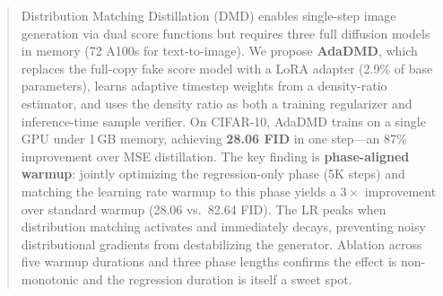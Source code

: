 \documentclass{article}
\theoremstyle{plain}
\theoremstyle{remark}
\begin{document}

\printAffiliationsAndNotice{}

\begin{abstract}
Distribution Matching Distillation (DMD) enables single-step image generation via dual score functions but requires three full diffusion models in memory (72 A100s for text-to-image). We propose \textbf{AdaDMD}, which replaces the full-copy fake score model with a LoRA adapter (2.9\% of base parameters), learns adaptive timestep weights from a density-ratio estimator, and uses the density ratio as both a training regularizer and inference-time sample verifier. On CIFAR-10, AdaDMD trains on a single GPU under 1\,GB memory, achieving \textbf{28.06 FID} in one step---an 87\% improvement over MSE distillation. The key finding is \textbf{phase-aligned warmup}: jointly optimizing the regression-only phase (5K steps) and matching the learning rate warmup to this phase yields a $3{\times}$ improvement over standard warmup (28.06 vs.\ 82.64 FID). The LR peaks when distribution matching activates and immediately decays, preventing noisy distributional gradients from destabilizing the generator. Ablation across five warmup durations and three phase lengths confirms the effect is non-monotonic and the regression duration is itself a sweet spot.
\end{abstract}
\end{document}
